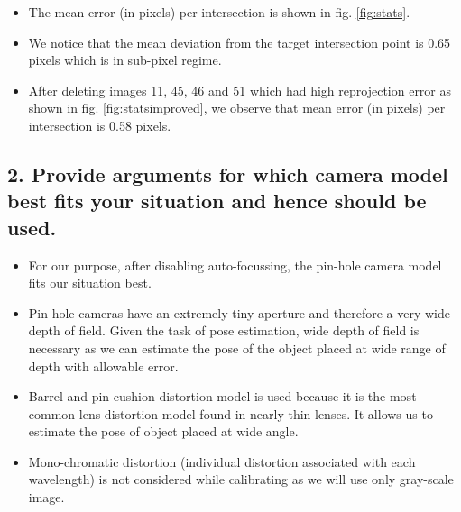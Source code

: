 \begin{itemize}
\item The mean error (in pixels) per intersection is shown in fig. \ref{fig:stats}.
\item We notice that the mean deviation from the target intersection point is 0.65 pixels which is in sub-pixel regime.
\item After deleting images 11, 45, 46 and 51 which had high reprojection error as shown in fig. \ref{fig:statsimproved}, we observe that mean error (in pixels) per intersection is 0.58 pixels.
\end{itemize}
\subsection*{2. Provide arguments for which camera model best fits your situation and hence should be used.}
\begin{itemize}
\item For our purpose, after disabling auto-focussing, the pin-hole camera model fits our situation best.
\item Pin hole cameras have an extremely tiny aperture and therefore a very wide depth of field. Given the task of pose estimation, wide depth of field is necessary as we can estimate the pose of the object placed at wide range of depth with allowable error.
\item Barrel and pin cushion distortion model is used because it is the most common lens distortion model found in nearly-thin lenses. It allows us to estimate the pose of object placed at wide angle.
\item Mono-chromatic distortion (individual distortion associated with each wavelength) is not considered while calibrating as we will use only gray-scale image.    
\end{itemize}

